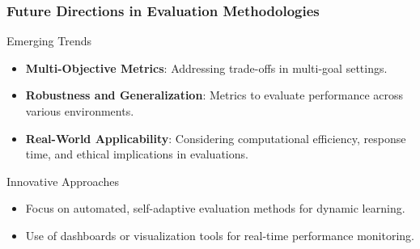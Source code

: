 \documentclass{beamer}
\begin{document}
\begin{frame}[fragile]
    \frametitle{Future Directions in Evaluation Methodologies}

    \begin{block}{Emerging Trends}
        \begin{itemize}
            \item \textbf{Multi-Objective Metrics}: Addressing trade-offs in multi-goal settings.
            \item \textbf{Robustness and Generalization}: Metrics to evaluate performance across various environments.
            \item \textbf{Real-World Applicability}: Considering computational efficiency, response time, and ethical implications in evaluations.
        \end{itemize}
    \end{block}

    \begin{block}{Innovative Approaches}
        \begin{itemize}
            \item Focus on automated, self-adaptive evaluation methods for dynamic learning.
            \item Use of dashboards or visualization tools for real-time performance monitoring.
        \end{itemize}
    \end{block}
\end{frame}
\end{document}
